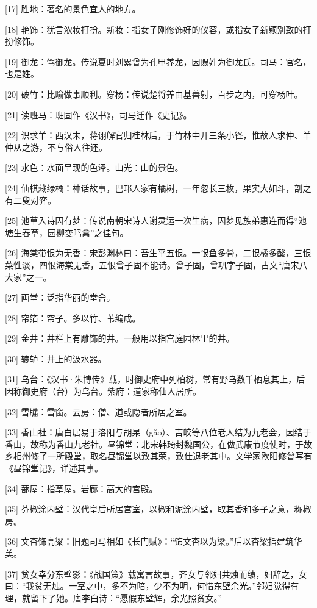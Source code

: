 \documentclass[12pt,UTF8]{ctexbook}
\begin{document}
[17] 胜地：著名的景色宜人的地方。

[18] 艳饰：犹言浓妆打扮。新妆：指女子刚修饰好的仪容，或指女子新颖别致的打扮修饰。

[19] 御龙：驾御龙。传说夏时刘累曾为孔甲养龙，因赐姓为御龙氏。司马：官名，也是姓。

[20] 破竹：比喻做事顺利。穿杨：传说楚将养由基善射，百步之内，可穿杨叶。

[21] 读班马：班固作《汉书》，司马迁作《史记》。

[22] 识求羊：西汉末，蒋诩解官归桂林后，于竹林中开三条小径，惟故人求仲、羊仲从之游，不与俗人往还。

[23] 水色：水面呈现的色泽。山光：山的景色。

[24] 仙棋藏绿橘：神话故事，巴邛人家有橘树，一年忽长三枚，果实大如斗，剖之有二叟对弈。

[25] 池草入诗因有梦：传说南朝宋诗人谢灵运一次生病，因梦见族弟惠连而得“池塘生春草，园柳变鸣禽”之佳句。

[26] 海棠带恨为无香：宋彭渊林曰：吾生平五恨。一恨鱼多骨，二恨橘多酸，三恨菜性淡，四恨海棠无香，五恨曾子固不能诗。曾子固，曾巩字子固，古文“唐宋八大家”之一。

[27] 画堂：泛指华丽的堂舍。

[28] 帘箔：帘子。多以竹、苇编成。

[29] 金井：井栏上有雕饰的井。一般用以指宫庭园林里的井。

[30] 辘轳：井上的汲水器。

[31] 乌台：《汉书·朱博传》载，时御史府中列柏树，常有野乌数千栖息其上，后因称御史府（台）为乌台。紫府：道家称仙人居所。

[32] 雪牖：雪窗。云房：僧、道或隐者所居之室。

[33] 香山社：唐白居易于洛阳与胡杲（gǎo）、吉皎等八位老人结为九老会，因结于香山，故称为香山九老社。昼锦堂：北宋韩琦封魏国公，在做武康节度使时，于故乡相州修了一所殿堂，取名昼锦堂以致其荣，致仕退老其中。文学家欧阳修曾写有《昼锦堂记》，详述其事。

[34] 蔀屋：指草屋。岩廊：高大的宫殿。

[35] 芬椒涂内壁：汉代皇后所居宫室，以椒和泥涂内壁，取其香和多子之意，称椒房。

[36] 文杏饰高粱：旧题司马相如《长门赋》：“饰文杏以为梁。”后以杏梁指建筑华美。

[37] 贫女幸分东壁影：《战国策》载寓言故事，齐女与邻妇共烛而绩，妇辞之，女曰：“我贫无烛。一室之中，多不为暗，少不为明，何惜东壁余光。”邻妇觉得有理，就留下了她。唐李白诗：“愿假东壁辉，余光照贫女。”
\end{document}

